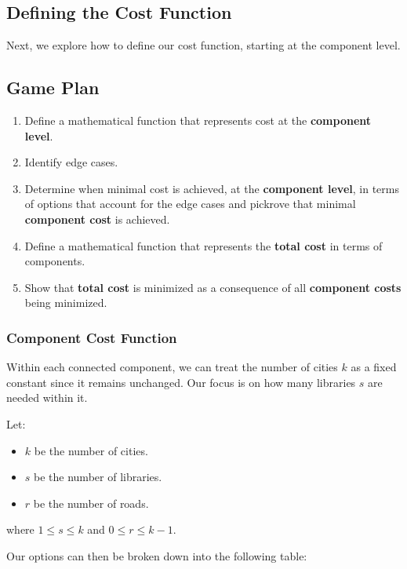 \documentclass[11pt, a4paper, oneside]{article}
\begin{document}
\subsection*{Defining the Cost Function}

Next, we explore how to define our cost function, starting at the component level.

\subsection*{Game Plan}

\begin{enumerate}
  \item Define a mathematical function that represents cost at the \textbf{component level}.
  \item Identify edge cases.
  \item Determine when minimal cost is achieved, at the \textbf{component level}, in terms of options that account for the edge cases and pickrove that minimal \textbf{component cost} is achieved. 
  \item Define a mathematical function that represents the \textbf{total cost} in terms of components.
  \item Show that \textbf{total cost} is minimized as a consequence of all \textbf{component costs} being minimized. 
\end{enumerate}

\subsubsection*{Component Cost Function}

Within each connected component, we can treat the number of cities \( k \) as a fixed constant since it remains unchanged. Our focus is on how many libraries \( s \) are needed within it.

Let:

\begin{itemize}
  \item \(k\) be the number of cities.
  \item \(s\) be the number of libraries.
  \item \(r\) be the number of roads.
\end{itemize}

where \( 1 \leq s \leq k \) and \( 0 \leq r \leq k - 1 \).

Our options can then be broken down into the following table:
\end{document}
